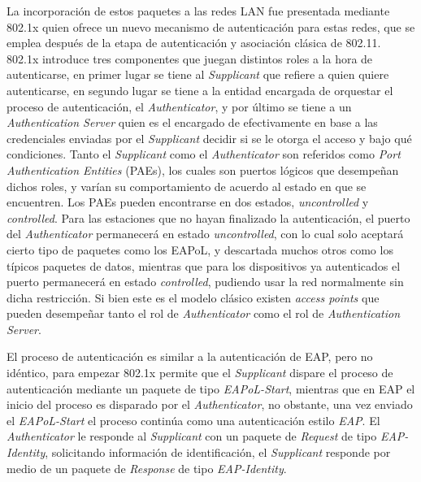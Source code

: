 \documentclass[10pt,a4paper]{article}
\begin{document}
La incorporación de estos paquetes a las redes LAN fue presentada mediante 802.1x quien ofrece un nuevo mecanismo de autenticación para estas redes, que se emplea después de la etapa de autenticación y asociación clásica de 802.11. 802.1x introduce tres componentes que juegan distintos roles a la hora de autenticarse, en primer lugar se tiene al \textit{Supplicant} que refiere a quien quiere autenticarse, en segundo lugar se tiene a la entidad encargada de orquestar el proceso de autenticación, el \textit{Authenticator}, y por último se tiene a un \textit{Authentication Server} quien es el encargado de efectivamente en base a las credenciales enviadas por el \textit{Supplicant} decidir si se le otorga el acceso y bajo qué condiciones. Tanto el \textit{Supplicant} como el \textit{Authenticator} son referidos como \textit{Port Authentication Entities} (PAEs), los cuales son puertos lógicos que desempeñan dichos roles, y varían su comportamiento de acuerdo al estado en que se encuentren. Los PAEs pueden encontrarse en dos estados, \textit{uncontrolled} y \textit{controlled}. Para las estaciones que no hayan finalizado la autenticación, el puerto del \textit{Authenticator} permanecerá en estado \textit{uncontrolled}, con lo cual solo aceptará cierto tipo de paquetes como los EAPoL, y descartada muchos otros como los típicos paquetes de datos, mientras que para los dispositivos ya autenticados el puerto permanecerá en estado \textit{controlled}, pudiendo usar la red normalmente sin dicha restricción. Si bien este es el modelo clásico existen \textit{access points} que pueden desempeñar tanto el rol de \textit{Authenticator} como el rol de \textit{Authentication Server}.

El proceso de autenticación es similar a la autenticación de EAP, pero no idéntico, para empezar 802.1x permite que el \textit{Supplicant} dispare el proceso de autenticación mediante un paquete de tipo \textit{EAPoL-Start}, mientras que en EAP el inicio del proceso es disparado por el \textit{Authenticator}, no obstante, una vez enviado el \textit{EAPoL-Start} el proceso continúa como una autenticación estilo \textit{EAP}. El \textit{Authenticator} le responde al \textit{Supplicant} con un paquete de \textit{Request} de tipo \textit{EAP-Identity}, solicitando información de identificación, el \textit{Supplicant} responde por medio de un paquete de \textit{Response} de tipo \textit{EAP-Identity}. 
\end{document}
